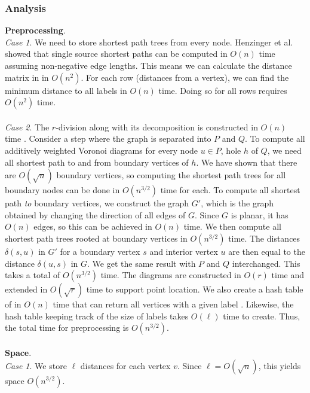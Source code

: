 \subsubsection{Analysis}\label{oracle2analysis}
\textbf{Preprocessing}. \\
\textit{Case 1}. We need to store shortest path
trees from every node. Henzinger et al. showed that single source shortest paths can be
computed in $O(n)$ time \cite{henzinger1997faster} assuming non-negative edge lengths.
This means we can calculate the distance matrix in in $O(n^2)$. For each row (distances
from a vertex), we can find the minimum distance to all labels in $O(n)$ time. Doing so
for all rows requires $O(n^2)$ time. \\
\\
\textit{Case 2}. The $r$-division along with its decomposition is constructed in $O(n)$
time \cite{klein2013structured}. Consider a step where the graph is separated into $P$ and $Q$. To compute all additively weighted Voronoi diagrams for every node $u\in
P$, hole $h$ of $Q$, we need all
shortest path to and from boundary vertices of $h$. We have shown that there are
$O(\sqrt{n})$ boundary vertices, so computing the shortest path trees for all
boundary nodes can be done in $O(n^{3/2})$ time for each. To compute all shortest path \textit{to} boundary vertices, we construct the graph
$G'$, which is the graph obtained by changing the direction of all edges of $G$. Since
$G$ is planar, it has $O(n)$ edges, so this can be achieved in $O(n)$ time. We then
compute all shortest path trees rooted at boundary vertices in $O(n^{3/2})$ time. The
distances $\delta(s,u)$ in $G'$ for a boundary vertex $s$ and interior vertex $u$ are then equal
to the distance $\delta(u,s)$ in $G$. We get the same result with $P$ and $Q$
interchanged. This takes a total of $O(n^{3/2})$ time. The diagrams are constructed in
$O(r)$ time and extended in $O(\sqrt{r})$ time to support point location. We also create a hash table of
in $O(n)$ time that can return all vertices with a given label \cite{fredman1984storing}.
Likewise, the hash table keeping track of the size of labels takes $O(\ell)$ time to
create. Thus, the total time for preprocessing is $O(n^{3/2})$. \\
\\
\textbf{Space}. \\
\textit{Case 1}. We store $\ell$ distances for each vertex $v$. Since $\ell=O(\sqrt{n})$, this
yields space $O(n^{3/2})$. \\
\\
